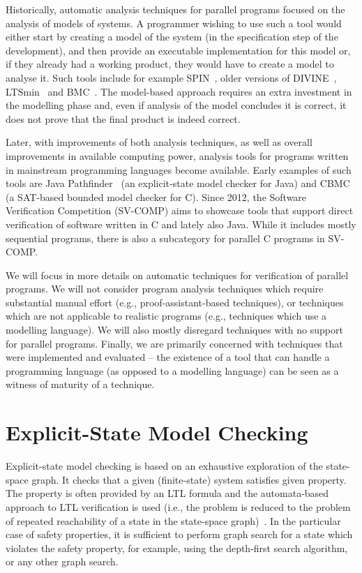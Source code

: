 Historically, automatic analysis techniques for parallel programs focused on the analysis of models of systems.
A programmer wishing to use such a tool would either start by creating a model
of the system (in the specification step of the development), and then provide
an executable implementation for this model or, if they already had a working
product, they would have to create a model to analyse it.
Such tools include for example SPIN~, older versions of DIVINE~, LTSmin~ and BMC~.
The model-based approach requires an extra investment in the modelling phase
and, even if analysis of the model concludes it is correct, it does not prove
that the final product is indeed correct.

Later, with improvements of both analysis techniques, as well as overall
improvements in available computing power, analysis tools for programs written
in mainstream programming languages become available.
Early examples of such tools are Java Pathfinder~ (an explicit-state model checker for Java) and CBMC~ (a SAT-based bounded model checker for C).
Since 2012, the Software Verification Competition (SV-COMP) 
aims to showcase tools that support direct verification of software written in
C and lately also Java.
While it includes mostly sequential programs, there is also a subcategory for
parallel C programs in SV-COMP.

We will focus in more details on automatic techniques for verification of
parallel programs.
We will not consider program analysis techniques which require substantial manual effort (e.g., proof-assistant-based techniques), or techniques which are not applicable to realistic programs (e.g., techniques which use a modelling language).
We will also mostly disregard techniques with no support for parallel programs.
Finally, we are primarily concerned with techniques that were implemented and evaluated -- the existence of a tool that can handle a programming language (as opposed to a modelling language) can be seen as a witness of maturity of a technique.

\section{Explicit-State Model Checking}

Explicit-state model checking is based on an exhaustive exploration of the
state-space graph.
It checks that a given (finite-state) system satisfies given property.
The property is often provided by an LTL formula and the automata-based approach
to LTL verification is used (i.e., the problem is reduced to the problem of
repeated reachability of a state in the state-space graph)~.
In the particular case of safety properties, it is sufficient to perform graph
search for a state which violates the safety property, for example, using the
depth-first search algorithm, or any other graph search.

